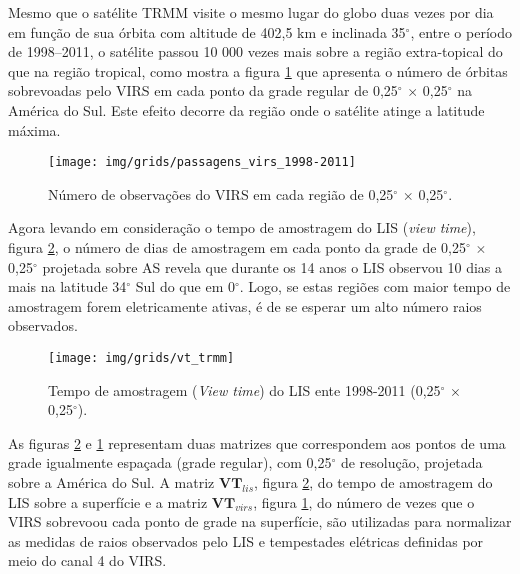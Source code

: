 Mesmo que o satélite TRMM visite o mesmo lugar do globo duas vezes por dia em função de sua órbita com altitude de 402,5 km e  inclinada 35$^{\circ}$, entre o período de 1998--2011, o satélite passou {10 000} vezes mais sobre a região extra-topical do que na região tropical, como mostra a figura \ref{VirsVT} que apresenta o número de órbitas sobrevoadas pelo VIRS em cada ponto da grade regular de 0,25$^{\circ}$  $\times$ 0,25$^{\circ}$ na América do Sul. Este efeito decorre da região onde o satélite atinge a latitude máxima.

\begin{figure}[!hb]
  \centering
  {{\texttt{[image: img/grids/passagens\_virs\_1998-2011]}}}
\caption{Número de observações do VIRS em cada região de 0,25$^{\circ}$  $\times$ 0,25$^{\circ}$.}
\label{VirsVT}
\end{figure} 


Agora levando em consideração o tempo de amostragem do LIS (\textit{view time}), figura \ref{lisVT}, o número de dias de amostragem em cada ponto da grade de 0,25$^{\circ}$  $\times$ 0,25$^{\circ}$ projetada sobre AS revela que durante os 14 anos o LIS observou 10 dias a mais na latitude 34$^{\circ}$ Sul do que em 0$^{\circ}$. Logo, se estas regiões com maior tempo de amostragem forem eletricamente ativas, é de se esperar um alto número raios observados.

\begin{figure}[!ht]
  \centering
  {{\texttt{[image: img/grids/vt\_trmm]}} }
  \caption{Tempo de amostragem (\textit{View time}) do LIS ente 1998-2011 (0,25$^{\circ}$  $\times$ 0,25$^{\circ}$).}
\label{lisVT}
\end{figure} 

As figuras  \ref{lisVT} e \ref{VirsVT} representam duas matrizes que correspondem aos pontos de uma grade igualmente espaçada (grade regular), com 0,25$^{\circ}$ de resolução, projetada sobre a América do Sul. A matriz $\mathbf{VT}_{lis}$, figura \ref{lisVT}, do tempo de amostragem do LIS sobre a superfície e a matriz $\mathbf{VT}_{virs}$, figura \ref{VirsVT}, do número de vezes que o VIRS sobrevoou cada ponto de grade na superfície, são utilizadas para normalizar as medidas de raios observados pelo LIS e tempestades elétricas definidas por meio do canal 4 do VIRS.  


